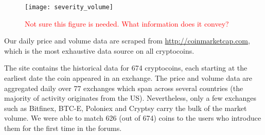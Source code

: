 \begin{figure}
\texttt{[image: severity\_volume]}
\caption{\textcolor{red}{Not sure this figure is needed. What information does it convey?}}
\end{figure}
Our daily price and volume data are scraped from \url{http://coinmarketcap.com}, which is the most exhaustive data source on all cryptocoins.

The site contains the historical data for 674 cryptocoins, each starting at the earliest date the coin appeared in an exchange.  The price and volume data are aggregated daily over 77 exchanges which span across several countries (the majority of activity originates from the US). Nevertheless, only a few exchanges such as Bitfinex, BTC-E, Poloniex and Cryptsy carry the bulk of the market volume. We were able to match 626 (out of 674) coins to the users who introduce them for the first time in the forums.
